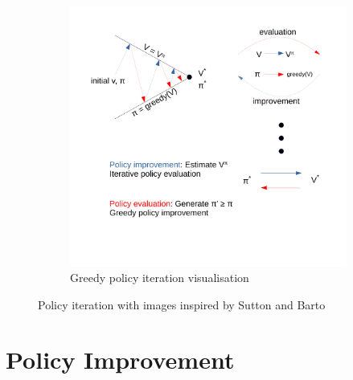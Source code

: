 \begin{figure}[!htb]
\begin{subfigure}{.49\textwidth}
		\includegraphics[width=1\linewidth]{MDP/fig/Policy_iteration.pdf}
		\caption{Greedy policy iteration visualisation\cite{David_Silver}}
		\label{fig:greedy_policy_iteration}
	\end{subfigure}
	\caption{Policy iteration with images inspired by Sutton and Barto \cite{sutton_barto}}
	\label{fig:policy_iteration}
\end{figure}

\section{Policy Improvement}

